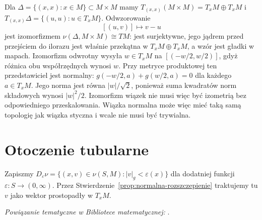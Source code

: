 \begin{przyklad}
\label{prz:normalna-diagonalna}
Dla $\Delta=\{(x,x):x\in M\}\subset M\times M$
mamy $T_{(x,x)}(M\times M)=T_xM\oplus T_xM$
i $T_{(x,x)}\Delta=\{(u,u):u\in T_xM\}$.
Odwzorowanie
\[
 [(u,v)]\longmapsto v-u
\]
jest izomorfizmem $\nu(\Delta,M\times M)\cong TM$:
jest surjektywne, jego jądrem przed
przejściem do ilorazu jest właśnie
przekątna w $T_xM\oplus T_xM$,
a wzór jest gładki w mapach.
Izomorfizm odwrotny wysyła $w\in T_xM$ na
$[(-w/2,w/2)]$, gdyż różnica obu współrzędnych wynosi $w$.
Przy metryce produktowej ten przedstawiciel jest normalny:
$g(-w/2,a)+g(w/2,a)=0$ dla każdego $a\in T_xM$.
Jego norma jest równa $|w|/\sqrt2$, ponieważ suma kwadratów
norm składowych wynosi $|w|^2/2$.
Izomorfizm wiązek nie musi więc być izometrią
bez odpowiedniego przeskalowania.
Wiązka normalna może więc mieć
taką samą topologię jak wiązka styczna
i wcale nie musi być trywialna.
\end{przyklad}

\section{Otoczenie tubularne}
\label{sec:otoczenie-tubularne}

Zapiszmy
$D_\varepsilon\nu
=\{(x,v)\in\nu(S,M):|v|_g<\varepsilon(x)\}$
dla dodatniej funkcji $\varepsilon:S\to(0,\infty)$.
Przez Stwierdzenie~\ref{prop:normalna-rozszczepienie}
traktujemy tu $v$ jako wektor prostopadły
w $T_xM$.

\noindent\emph{Powiązanie tematyczne w Bibliotece matematycznej:} .

